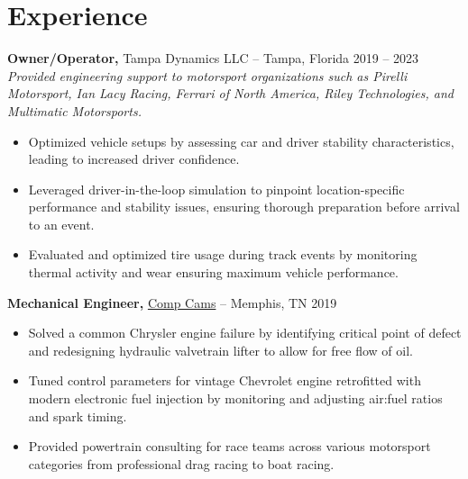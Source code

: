 \documentclass[12pt,letterpaper]{article} %
\begin{document}
\vspace{-18.5pt} %


\section*{Experience}
\textbf{Owner/Operator,} Tampa Dynamics LLC -- Tampa, Florida \hfill 2019 -- 2023 \\
\vspace{3pt}
\textit{Provided engineering support to motorsport organizations such as Pirelli Motorsport, Ian Lacy Racing, Ferrari of North America, Riley Technologies, and Multimatic Motorsports.}
\vspace{-5pt}
\begin{itemize}
  \item Optimized vehicle setups by assessing car and driver stability characteristics, leading to increased driver confidence.
  \item Leveraged driver-in-the-loop simulation to pinpoint location-specific performance and stability issues, ensuring thorough preparation before arrival to an event.
  \item Evaluated and optimized tire usage during track events by monitoring thermal activity and wear ensuring maximum vehicle performance.
\end{itemize}

\textbf{Mechanical Engineer,} \href{https://www.compcams.com/}{Comp Cams} -- Memphis, TN \hfill 2019 \\
\vspace{-9pt}
\begin{itemize}
  \item Solved a common Chrysler engine failure by identifying critical point of defect and redesigning hydraulic valvetrain lifter to allow for free flow of oil.
  \item Tuned control parameters for vintage Chevrolet engine retrofitted with modern electronic fuel injection by monitoring and adjusting air:fuel ratios and spark timing.
  \item Provided powertrain consulting for race teams across various motorsport categories from professional drag racing to boat racing.
\end{itemize}

\vspace{-18.5pt} %

\end{document}

